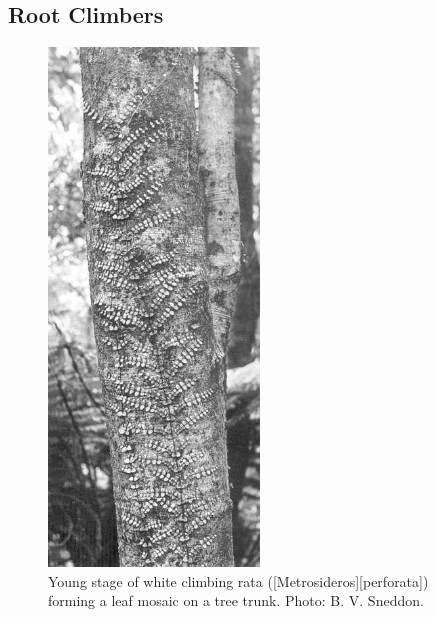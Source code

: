 \subsection{Root Climbers}

\begin{figure}
	\includegraphics[width=0.5\textwidth]{graphics/figure30rata.jpg}
	\centering
	\caption[Young stage of white climbing rata]{Young stage of white climbing rata ([Metrosideros][perforata]) forming a leaf mosaic on a tree trunk. Photo: B. V. Sneddon.}%
	\label{fig:30rata}
\end{figure}

